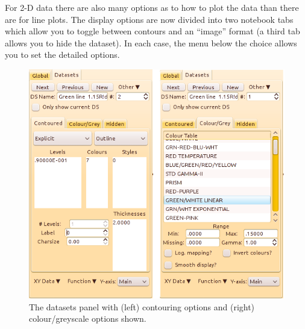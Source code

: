 \documentclass[11pt,twoside,english]{article}
\begin{document}
For 2-D data there are also many options as to how to plot the data
than there are for line plots. The display options are now divided into
two notebook tabs which allow you to toggle between contours and an
{}``image'' format (a third tab allows you to hide the dataset).  In
each case, the menu below the choice allows you to set the detailed
options.
\begin{figure}[htbp]
  \centering
  \includegraphics{main-2d}
  \caption{The datasets panel with (left) contouring options and
    (right) colour/greyscale options shown.}
  \label{contour}
\end{figure}
\end{document}
